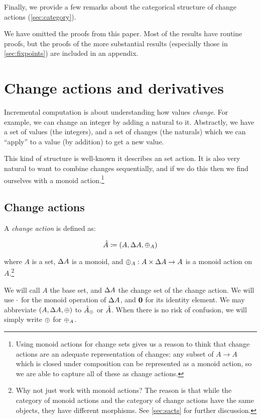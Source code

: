 Finally, we provide a few remarks about the categorical structure of change
actions (\cref{sec:category}).

We have omitted the proofs from this paper. Most of the results have routine
proofs, but the proofs of the more substantial results
(especially those in \cref{sec:fixpoints}) are included in an appendix.

\section{Change actions and derivatives}
\label{sec:changeActions}

Incremental computation is about understanding how values \emph{change}. For
example, we can change an integer by adding a natural to it.
Abstractly, we have a set of values (the integers), and a set of changes
(the naturals) which we can ``apply'' to a value (by addition) to get a new value.

This kind of structure is well-known \textemdash{} it describes an set action. It is
also very natural to want to combine changes sequentially, and if we do this
then we find ourselves with a monoid action.\footnote{
Using monoid actions for change sets gives us a reason to think that
change actions are an adequate representation of changes: any subset of $A
\rightarrow A$ which is closed under composition can be
represented as a monoid action, so we are able to capture all of these as change
actions.}

\subsection{Change actions}
\label{sec:changeAction}

\begin{defn}
  A \emph{change action} is defined as:

  \begin{displaymath}
    \hat{A} \coloneqq (A,\Delta A,\oplus_A)
  \end{displaymath}

  where $A$ is a set, $\Delta A$ is a monoid, and $\oplus_A : A \times \Delta A \rightarrow A$ is a monoid action on $A$.\footnote{Why not
    just work with monoid actions? The reason is that while the category of
    monoid actions and the category of change actions have the same objects, they
  have different morphisms. See \cref{sec:sacts} for further discussion.}

  We will call $A$ the base set, and $\Delta A$ the change set of the change
  action. We will use $\cdot$ for the monoid operation of $\Delta A$, and
  $\mathbf{0}$ for its identity element. We may abbreviate $(A,\Delta A,\oplus)$ to $\hat{A}_\oplus$ or $\hat{A}$. When there is no risk of confusion, we will simply write $\oplus$ for $\oplus_A$.
\end{defn}

